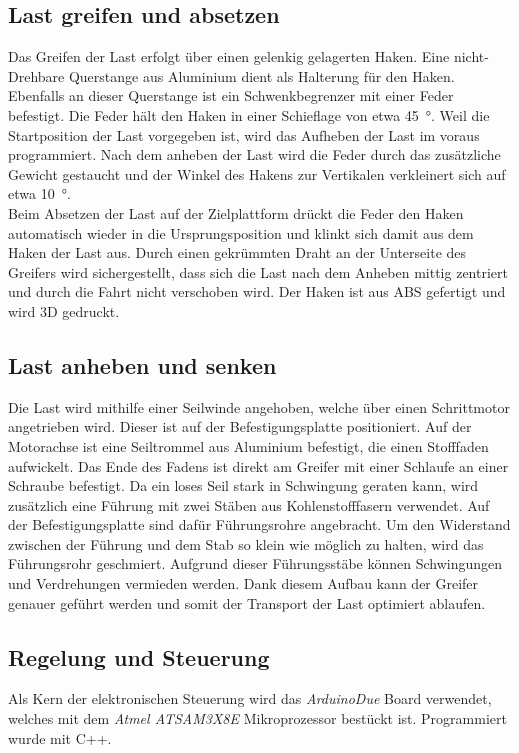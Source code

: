 \documentclass[a4paper]{report}
\begin{document}
\subsection{Last greifen und absetzen}
\label{ssec:Lastgreifenundabsetzen}
Das Greifen der Last erfolgt über einen gelenkig gelagerten Haken.  Eine nicht-Drehbare Querstange aus Aluminium dient als Halterung für den Haken. Ebenfalls an dieser Querstange ist ein Schwenkbegrenzer mit einer Feder befestigt. Die Feder hält den Haken in einer Schieflage von etwa 45\SI{}{\degree}. Weil die Startposition der Last vorgegeben ist, wird das Aufheben der Last im voraus programmiert.
Nach dem anheben der Last wird die Feder durch das zusätzliche Gewicht gestaucht und der Winkel des Hakens zur Vertikalen verkleinert sich auf etwa 10\SI{}{\degree}.\\
Beim Absetzen der Last auf der Zielplattform drückt die Feder den Haken automatisch wieder in die Ursprungsposition und klinkt sich damit aus dem Haken der Last aus.
Durch einen gekrümmten Draht an der Unterseite des Greifers wird sichergestellt, dass sich die Last nach dem Anheben mittig zentriert und durch die Fahrt nicht verschoben wird.
Der Haken ist aus ABS gefertigt und wird 3D gedruckt.

\subsection{Last anheben und senken}
\label{ssec:Lastanhebenundsenken}
Die Last wird mithilfe einer Seilwinde angehoben, welche über einen Schrittmotor angetrieben wird. Dieser ist auf der Befestigungsplatte positioniert. Auf der Motorachse ist eine Seiltrommel aus Aluminium befestigt, die einen Stofffaden aufwickelt. Das Ende des Fadens ist direkt am Greifer mit einer Schlaufe an einer Schraube befestigt.
Da ein loses Seil stark in Schwingung geraten kann, wird zusätzlich eine Führung mit zwei Stäben aus Kohlenstofffasern verwendet. Auf der Befestigungsplatte sind dafür Führungsrohre angebracht. Um den Widerstand zwischen der Führung und dem Stab so klein wie möglich zu halten, wird das Führungsrohr geschmiert. Aufgrund dieser Führungsstäbe können Schwingungen und Verdrehungen vermieden werden.
Dank diesem Aufbau kann der Greifer genauer geführt werden und somit der Transport der Last optimiert ablaufen.



\subsection{Regelung und Steuerung}
\label{ssec:RegelungundSteuerung}
Als Kern der elektronischen Steuerung wird das \textit{ArduinoDue} Board verwendet, welches mit dem \textit{Atmel ATSAM3X8E} Mikroprozessor bestückt ist. Programmiert wurde mit C++.
\end{document}
